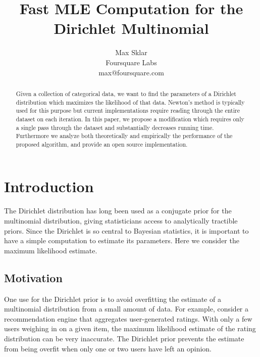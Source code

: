 \documentclass[twoside]{article}
\begin{document}
\parindent=0in
\parskip=12pt

%
%
%
%

\title{Fast MLE Computation for the Dirichlet Multinomial}

\author{Max Sklar\\
Foursquare Labs\\
max@foursquare.com
}

\maketitle
\thispagestyle{empty}

\begin{abstract}
Given a collection of categorical data, we want to find the parameters of a Dirichlet distribution which maximizes the likelihood of that data.  Newton's method is typically used for this purpose but current implementations require reading through the entire dataset on each iteration.  In this paper, we propose a modification which requires only a single pass through the dataset and substantially decreases running time.  Furthermore we analyze both theoretically and empirically the performance of the proposed algorithm, and provide an open source implementation.
\end{abstract}

\section{Introduction}

The Dirichlet distribution has long been used as a conjugate prior for the multinomial distribution, giving statisticians access to analytically tractible priors. Since the Dirichlet is so central to Bayesian statistics, it is important to have a simple computation to estimate its parameters. Here we consider the maximum likelihood estimate.

\subsection{Motivation}

One use for the Dirichlet prior is to avoid overfitting the estimate of a multinomial distribution from a small amount of data.  For example, consider a recommendation engine that aggregates user-generated ratings.  With only a few users weighing in on a given item, the maximum likelihood estimate of the rating distribution can be very inaccurate.  The Dirichlet prior prevents the estimate from being overfit when only one or two users have left an opinion.
\end{document}
